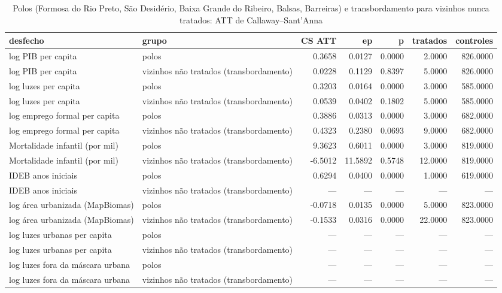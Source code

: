 \begin{table}
\caption{Polos (Formosa do Rio Preto, São Desidério, Baixa Grande do Ribeiro, Balsas, Barreiras) e transbordamento para vizinhos nunca tratados: ATT de Callaway–Sant'Anna}
\label{tab:s08_heterog_polos}
\begin{tabular}{llrrrrr}
\toprule
desfecho & grupo & CS ATT & ep & p & tratados & controles \\
\midrule
log PIB per capita & polos & 0.3658 & 0.0127 & 0.0000 & 2.0000 & 826.0000 \\
log PIB per capita & vizinhos não tratados (transbordamento) & 0.0228 & 0.1129 & 0.8397 & 5.0000 & 826.0000 \\
log luzes per capita & polos & 0.3203 & 0.0164 & 0.0000 & 3.0000 & 585.0000 \\
log luzes per capita & vizinhos não tratados (transbordamento) & 0.0539 & 0.0402 & 0.1802 & 5.0000 & 585.0000 \\
log emprego formal per capita & polos & 0.3886 & 0.0313 & 0.0000 & 3.0000 & 682.0000 \\
log emprego formal per capita & vizinhos não tratados (transbordamento) & 0.4323 & 0.2380 & 0.0693 & 9.0000 & 682.0000 \\
Mortalidade infantil (por mil) & polos & 9.3623 & 0.6011 & 0.0000 & 3.0000 & 819.0000 \\
Mortalidade infantil (por mil) & vizinhos não tratados (transbordamento) & -6.5012 & 11.5892 & 0.5748 & 12.0000 & 819.0000 \\
IDEB anos iniciais & polos & 0.6294 & 0.0400 & 0.0000 & 1.0000 & 619.0000 \\
IDEB anos iniciais & vizinhos não tratados (transbordamento) & — & — & — & — & — \\
log área urbanizada (MapBiomas) & polos & -0.0718 & 0.0135 & 0.0000 & 5.0000 & 823.0000 \\
log área urbanizada (MapBiomas) & vizinhos não tratados (transbordamento) & -0.1533 & 0.0316 & 0.0000 & 22.0000 & 823.0000 \\
log luzes urbanas per capita & polos & — & — & — & — & — \\
log luzes urbanas per capita & vizinhos não tratados (transbordamento) & — & — & — & — & — \\
log luzes fora da máscara urbana & polos & — & — & — & — & — \\
log luzes fora da máscara urbana & vizinhos não tratados (transbordamento) & — & — & — & — & — \\
\bottomrule
\end{tabular}
\end{table}
